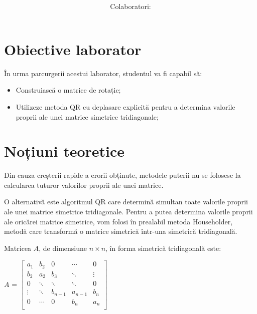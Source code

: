 \documentclass{exam}
\title{
	\textmd{\textbf{\MNLabTitle}}
	\author{Colaboratori: \MNAuthor}
}
\begin{document}
\begin{coverpages}

	\maketitle
	\tableofcontents

\end{coverpages}

\section{Obiective laborator}

În urma parcurgerii acestui laborator, studentul va fi capabil să:

\begin{itemize}
	\item Construiască o matrice de rotație;
	\item Utilizeze metoda QR cu deplasare explicită pentru a determina valorile proprii ale unei matrice simetrice tridiagonale;
\end{itemize}


\section{Noțiuni teoretice}

Din cauza creșterii rapide a erorii obținute, metodele puterii nu se folosesc la calcularea tuturor valorilor proprii ale unei matrice.

O alternativă este algoritmul QR care determină simultan toate valorile proprii ale unei matrice \mbox{simetrice} tridiagonale. Pentru a putea determina valorile proprii ale oricărei matrice simetrice, vom folosi în prealabil metoda Householder, metodă care transformă o matrice simetrică într-una simetrică tridiagonală.

Matricea $A$, de dimensiune $n\times n$, în forma simetrică tridiagonală este:
\begin{center}
	$A$ = $\begin{bmatrix}
			a_{1}  & b_{2}  & 0       & \cdots  & 0      \\
			b_{2}  & a_{2}  & b_{3}   & \ddots  & \vdots \\
			0      & \ddots & \ddots  & \ddots  & 0      \\
			\vdots & \ddots & b_{n-1} & a_{n-1} & b_{n}  \\
			0      & \cdots & 0       & b_{n}   & a_{n}  \\
		\end{bmatrix}$
\end{center}
\end{document}
